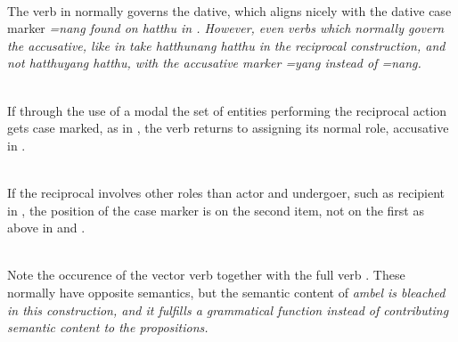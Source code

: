  \\

The verb  in  normally governs the dative, which aligns nicely with the dative case marker \em =nang \em found on \em hatthu \em in . However, even verbs which normally govern the accusative, like  in  take \em hatthunang hatthu \em in the reciprocal construction, and not \em *hatthuyang hatthu\em, with the accusative marker \em =yang \em instead of \em =nang\em.

 \\

If through the use of  a modal the set of entities performing the reciprocal action gets case marked, as in , the verb returns to assigning its normal role, accusative in .

 \\


If the reciprocal involves other roles than actor and undergoer, such as recipient in , the position of the case marker is on the second item, not on the first as above in  and .

 \\
Note the occurence of the vector verb  together with the full verb . These normally have opposite semantics, but the semantic content of \em ambel \em is bleached in this construction, and it fulfills a grammatical function instead of contributing semantic content to the propositions.

